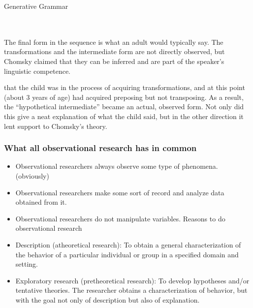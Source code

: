 \begin{refsection}
\begin{apatextbox}{Generative Grammar}
 \\  \\ 
\end{apatextbox}

The final form in the sequence is what an adult would typically say. The transformations and the intermediate form are not directly observed, but Chomsky claimed that they can be inferred and are part of the speaker's linguistic competence.

 that the child was in the process of acquiring transformations, and at this point (about 3 years of age) had acquired preposing but not transposing. As a result, the ``hypothetical intermediate'' became an actual, observed form. Not only did this give a neat explanation of what the child said, but in the other direction it lent support to Chomsky's theory. ~\citep{Brown:1972to} ~\citep{Chomsky:1965uu}

\subsubsection{What all observational research has in common}
\label{whatallobservationalresearchhasincommon}

\begin{itemize}
\item Observational researchers always observe some type of phenomena. (obviously)

\item Observational researchers make some sort of record and analyze data obtained from it.

\item Observational researchers do not manipulate variables.
Reasons to do observational research

\item Description (atheoretical research): To obtain a general characterization of the behavior of a particular individual or group in a specified domain and setting.

\item Exploratory research (pretheoretical research): To develop hypotheses and\slash or tentative theories. The researcher obtains a characterization of behavior, but with the goal not only of description but also of explanation.


\end{itemize}
\end{refsection}

